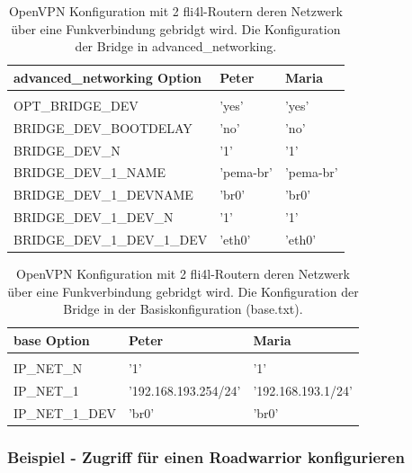 \begin{table}[htbp]
  \begin{scriptsize}
    \begin{tabular}{lll}
      advanced\_networking Option  & Peter           & Maria       \\
      \hline \\
      OPT\_BRIDGE\_DEV             & 'yes'           & 'yes'       \\
      BRIDGE\_DEV\_BOOTDELAY       & 'no'            & 'no'        \\
      BRIDGE\_DEV\_N               & '1'             & '1'         \\
      BRIDGE\_DEV\_1\_NAME         & 'pema-br'       & 'pema-br'   \\
      BRIDGE\_DEV\_1\_DEVNAME      & 'br0'           & 'br0'       \\
      BRIDGE\_DEV\_1\_DEV\_N       & '1'             & '1'         \\
      BRIDGE\_DEV\_1\_DEV\_1\_DEV  & 'eth0'          & 'eth0'      \\
    \end{tabular}
  \end{scriptsize}
  \caption{OpenVPN Konfiguration mit 2 fli4l-Routern deren Netzwerk über eine Funkverbindung gebridgt wird. Die Konfiguration der Bridge in advanced\_networking.}
\end{table}

\begin{table}[htbp]
  \begin{scriptsize}
    \begin{tabular}{lll}
      base Option  & Peter           & Maria       \\
      \hline \\
      IP\_NET\_N            & '1'                   & '1'                    \\
      IP\_NET\_1            & '192.168.193.254/24'  & '192.168.193.1/24'     \\
      IP\_NET\_1\_DEV       & 'br0'                 & 'br0'                  \\
    \end{tabular}
  \end{scriptsize}
  \caption{OpenVPN Konfiguration mit 2 fli4l-Routern deren Netzwerk über eine Funkverbindung gebridgt wird. Die Konfiguration der Bridge in der Basiskonfiguration (base.txt).}
\end{table}

\subsubsection{Beispiel - Zugriff für einen Roadwarrior konfigurieren}

